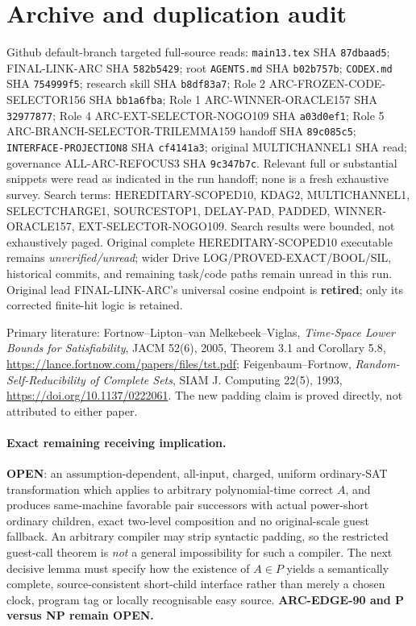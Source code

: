 \documentclass[11pt]{article}
\begin{document}
\section*{Archive and duplication audit}
Github default-branch targeted full-source reads: \texttt{main13.tex} SHA \texttt{87dbaad5}; FINAL-LINK-ARC SHA \texttt{582b5429}; root \texttt{AGENTS.md} SHA \texttt{b02b757b}; \texttt{CODEX.md} SHA \texttt{754999f5}; research skill SHA \texttt{b8df83a7}; Role 2 ARC-FROZEN-CODE-SELECTOR156 SHA \texttt{bb1a6fba}; Role 1 ARC-WINNER-ORACLE157 SHA \texttt{32977877}; Role 4 ARC-EXT-SELECTOR-NOGO109 SHA \texttt{a03d0ef1}; Role 5 ARC-BRANCH-SELECTOR-TRILEMMA159 handoff SHA \texttt{89c085c5}; \texttt{INTERFACE-PROJECTION8} SHA \texttt{cf4141a3}; original MULTICHANNEL1 SHA read; governance ALL-ARC-REFOCUS3 SHA \texttt{9c347b7c}. Relevant full or substantial snippets were read as indicated in the run handoff; none is a fresh exhaustive survey. Search terms: HEREDITARY-SCOPED10, KDAG2, MULTICHANNEL1, SELECTCHARGE1, SOURCESTOP1, DELAY-PAD, PADDED, WINNER-ORACLE157, EXT-SELECTOR-NOGO109. Search results were bounded, not exhaustively paged. Original complete HEREDITARY-SCOPED10 executable remains \emph{unverified/unread}; wider Drive LOG/PROVED-EXACT/BOOL/SIL, historical commits, and remaining task/code paths remain unread in this run. Original lead FINAL-LINK-ARC's universal cosine endpoint is \textbf{retired}; only its corrected finite-hit logic is retained.

Primary literature: Fortnow--Lipton--van Melkebeek--Viglas, \emph{Time-Space Lower Bounds for Satisfiability}, JACM 52(6), 2005, Theorem 3.1 and Corollary 5.8, \url{https://lance.fortnow.com/papers/files/tst.pdf}; Feigenbaum--Fortnow, \emph{Random-Self-Reducibility of Complete Sets}, SIAM J. Computing 22(5), 1993, \url{https://doi.org/10.1137/0222061}. The new padding claim is proved directly, not attributed to either paper.

\paragraph{Exact remaining receiving implication.}
\textbf{OPEN}: an assumption-dependent, all-input, charged, uniform ordinary-SAT transformation which applies to arbitrary polynomial-time correct \(A\), and produces same-machine favorable pair successors with actual power-short ordinary children, exact two-level composition and no original-scale guest fallback. An arbitrary compiler may strip syntactic padding, so the restricted guest-call theorem is \emph{not} a general impossibility for such a compiler. The next decisive lemma must specify how the existence of \(A\in P\) yields a semantically complete, source-consistent short-child interface rather than merely a chosen clock, program tag or locally recognisable easy source. \textbf{ARC-EDGE-90 and P versus NP remain OPEN.}
\end{document}
